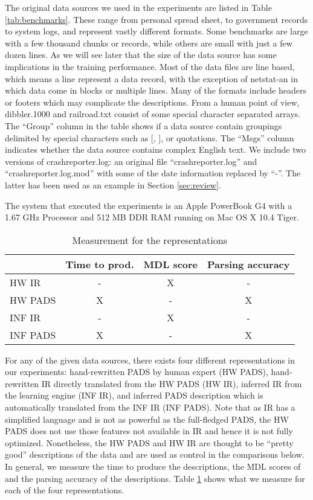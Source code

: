 The original data sources we used in the experiments are listed in Table \ref{tab:benchmarks}.
These range from personal spread sheet, to government records to system logs, and 
represent vastly different formats. Some benchmarks are large with a few thousand
chunks or records, while others are small with just a few dozen lines. As we will see later
that the size of the data source has some implications in the training performance.
Most of the data files are line based, which means a line represent a data record, with
the exception of netstat-an in which data come in blocks or multiple lines.
Many of the formats include headers or footers which may complicate the descriptions.
From a human point of view, dibbler.1000 and railroad.txt consist of some special
character separated arrays. The ``Group'' column in the table shows if a data source
contain groupings delimited by special characters such as [, ], or quotations.
The ``Msgs'' column indicates whether the data source contains complex English text.
We include two versions of crashreporter.log: an original file ``crashreporter.log''
and ``crashreporter.log.mod'' with some of the date information replaced by ``-''. 
The latter has been used as an example in Section \ref{sec:review}. 

The system that executed the experiments is an 
Apple PowerBook G4 with a 1.67 GHz Processor and 512 MB DDR RAM 
running on Mac OS X 10.4 Tiger. 

\begin{table}
\begin{center}
\begin{tabular}{|l|c|c|c|} \hline
		&  Time to prod.	& MDL score 	& Parsing accuracy 	\\ \hline
HW IR	& -			& X		& -			\\ \hline	
HW PADS	& X			& -		& X			\\ \hline	
INF IR 	& -			& X		& -			\\ \hline
INF PADS & X			& -		& X			\\ \hline 
\end{tabular}
\caption{Measurement for the representations} \label{tab:metrics}
\end{center}
\end{table}

For any of the given data sources, there exists four different representations in 
our experiments: hand-rewritten PADS by human expert (HW PADS), hand-rewritten IR directly
translated from the HW PADS (HW IR), inferred IR from the learning engine (INF IR), and
inferred PADS description which is automatically translated from the INF IR (INF PADS). 
Note that as IR has a simplified language and is not as powerful as the full-fledged
PADS, the HW PADS does not use those features not available in IR and hence it is
not fully optimized. 
Nonetheless, the HW PADS and HW IR are thought to be ``pretty good'' descriptions of
the data and are used as control in the comparisons below. 
In general, we measure the time to produce the descriptions, the MDL scores of
and the parsing accuracy of the descriptions. 
Table \ref{tab:metrics} shows what we measure for each of the four representations.

